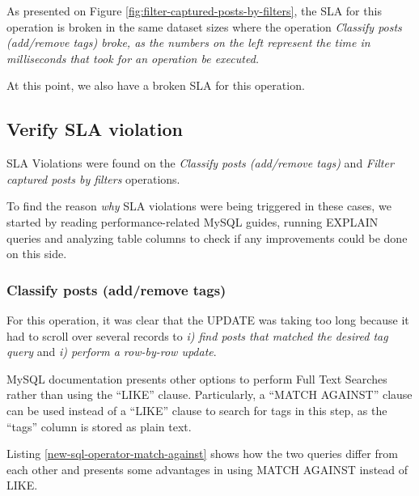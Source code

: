 As presented on Figure \ref{fig:filter-captured-posts-by-filters}, the SLA for this operation is broken in the same dataset sizes where the operation \textit{Classify posts (add/remove tags) broke, as the numbers on the left represent the time in milliseconds that took for an operation be executed.  }

At this point, we also have a broken SLA for this operation. 























\clearpage
\subsection{Verify SLA violation}
SLA Violations were found on the \textit{Classify posts (add/remove tags)} and \textit{Filter captured posts by filters} operations. 

To find the reason \textit{why} SLA violations were being triggered in these cases, we started by reading performance-related MySQL guides, running EXPLAIN queries and analyzing table columns to check if any improvements could be done on this side.

\subsubsection{Classify posts (add/remove tags)}
\label{classifypostssection}
For this operation, it was clear that the UPDATE was taking too long because it had to scroll over several records to \textit{i) find posts that matched the desired tag query} and \textit{i) perform a row-by-row update}.

MySQL documentation presents other options to perform Full Text Searches rather than using the ``LIKE'' clause. Particularly, a ``MATCH AGAINST'' clause can be used instead of a ``LIKE'' clause to search for tags in this step, as the ``tags'' column is stored as plain text. 

Listing \ref{new-sql-operator-match-against} shows how the two queries differ from each other and \cite{stackoverflowmatch} presents some advantages in using MATCH AGAINST instead of LIKE.

